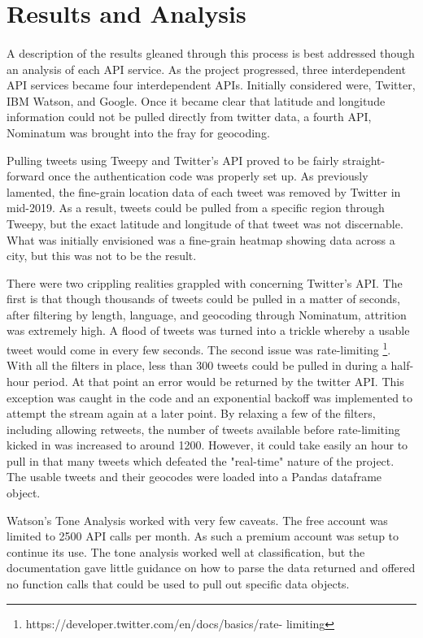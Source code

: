 \documentclass[12pt, oneside]{article}
\begin{document}
\section{Results and Analysis}
\paragraph{}
A description of the results gleaned through this process is best addressed
though an analysis of each API service. As the project progressed, three
interdependent API services became four interdependent APIs. Initially
considered
were, Twitter, IBM Watson, and Google. Once it became clear that latitude and
longitude information could not be pulled directly from twitter data, a fourth
API, Nominatum was brought into the fray for geocoding.

Pulling tweets using Tweepy and Twitter's API proved to be fairly straight-
forward once the authentication code was properly set up. As previously
lamented, the fine-grain location data of each tweet was removed
by Twitter in mid-2019. As a result, tweets could be pulled from a specific
region through Tweepy, but the exact latitude and longitude of that
tweet was not discernable. What was initially envisioned was a fine-grain heatmap showing data across a city, but this was not to be the result.

There were two crippling realities grappled with concerning Twitter's API. The
first is that though thousands of tweets could be pulled in a matter of
seconds, after filtering by length, language, and geocoding through Nominatum,
attrition was extremely high. A flood of tweets was turned into a trickle
whereby a usable tweet would come in every few seconds. The second issue was
rate-limiting \footnote{https://developer.twitter.com/en/docs/basics/rate-
limiting}. With all the filters in place, less than 300 tweets could be pulled
in during a half-hour period. At that point an error would be returned by the
twitter API. This exception was caught in the code and an exponential backoff
was implemented to attempt the stream again at a later point. By relaxing a few
of the filters, including allowing retweets, the number of tweets available
before rate-limiting kicked in was increased to around 1200. However, it could
take easily an hour to pull in that many tweets which defeated the "real-time"
nature of the project. The usable tweets and their geocodes were loaded into a
Pandas dataframe object.

Watson's Tone Analysis worked with very few caveats. The free account was
limited to 2500 API calls per month. As such a premium account was setup to
continue its use. The tone analysis worked well at classification, but the
documentation gave little guidance on how to parse the data returned and
offered no function calls that could be used to pull out specific data objects.
\end{document}
